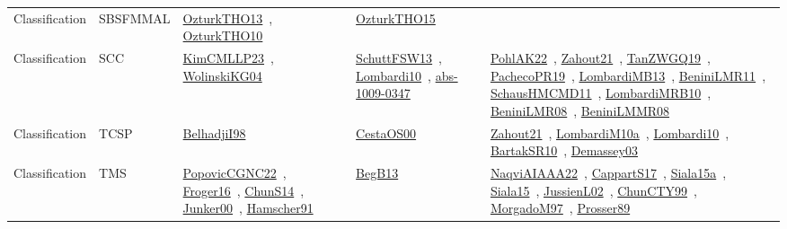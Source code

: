{\begin{longtable}{lp{3cm}>{\raggedright\arraybackslash}p{6cm}>{\raggedright\arraybackslash}p{6cm}>{\raggedright\arraybackslash}p{8cm}}
\index{SBSFMMAL}\index{Classification!SBSFMMAL}Classification & SBSFMMAL & \href{../works/OzturkTHO13.pdf}{OzturkTHO13}~\cite{OzturkTHO13}, \href{../works/OzturkTHO10.pdf}{OzturkTHO10}~\cite{OzturkTHO10} & \href{../works/OzturkTHO15.pdf}{OzturkTHO15}~\cite{OzturkTHO15} & \\
\index{SCC}\index{Classification!SCC}Classification & SCC & \href{../works/KimCMLLP23.pdf}{KimCMLLP23}~\cite{KimCMLLP23}, \href{../works/WolinskiKG04.pdf}{WolinskiKG04}~\cite{WolinskiKG04} & \href{../works/SchuttFSW13.pdf}{SchuttFSW13}~\cite{SchuttFSW13}, \href{../works/Lombardi10.pdf}{Lombardi10}~\cite{Lombardi10}, \href{../works/abs-1009-0347.pdf}{abs-1009-0347}~\cite{abs-1009-0347} & \href{../works/PohlAK22.pdf}{PohlAK22}~\cite{PohlAK22}, \href{../works/Zahout21.pdf}{Zahout21}~\cite{Zahout21}, \href{../works/TanZWGQ19.pdf}{TanZWGQ19}~\cite{TanZWGQ19}, \href{../works/PachecoPR19.pdf}{PachecoPR19}~\cite{PachecoPR19}, \href{../works/LombardiMB13.pdf}{LombardiMB13}~\cite{LombardiMB13}, \href{../works/BeniniLMR11.pdf}{BeniniLMR11}~\cite{BeniniLMR11}, \href{../works/SchausHMCMD11.pdf}{SchausHMCMD11}~\cite{SchausHMCMD11}, \href{../works/LombardiMRB10.pdf}{LombardiMRB10}~\cite{LombardiMRB10}, \href{../works/BeniniLMR08.pdf}{BeniniLMR08}~\cite{BeniniLMR08}, \href{../works/BeniniLMMR08.pdf}{BeniniLMMR08}~\cite{BeniniLMMR08}\\
\index{TCSP}\index{Classification!TCSP}Classification & TCSP & \href{../works/BelhadjiI98.pdf}{BelhadjiI98}~\cite{BelhadjiI98} & \href{../works/CestaOS00.pdf}{CestaOS00}~\cite{CestaOS00} & \href{../works/Zahout21.pdf}{Zahout21}~\cite{Zahout21}, \href{../works/LombardiM10a.pdf}{LombardiM10a}~\cite{LombardiM10a}, \href{../works/Lombardi10.pdf}{Lombardi10}~\cite{Lombardi10}, \href{../works/BartakSR10.pdf}{BartakSR10}~\cite{BartakSR10}, \href{../works/Demassey03.pdf}{Demassey03}~\cite{Demassey03}\\
\index{TMS}\index{Classification!TMS}Classification & TMS & \href{../works/PopovicCGNC22.pdf}{PopovicCGNC22}~\cite{PopovicCGNC22}, \href{../works/Froger16.pdf}{Froger16}~\cite{Froger16}, \href{../works/ChunS14.pdf}{ChunS14}~\cite{ChunS14}, \href{../works/Junker00.pdf}{Junker00}~\cite{Junker00}, \href{../works/Hamscher91.pdf}{Hamscher91}~\cite{Hamscher91} & \href{../works/BegB13.pdf}{BegB13}~\cite{BegB13} & \href{../works/NaqviAIAAA22.pdf}{NaqviAIAAA22}~\cite{NaqviAIAAA22}, \href{../works/CappartS17.pdf}{CappartS17}~\cite{CappartS17}, \href{../works/Siala15a.pdf}{Siala15a}~\cite{Siala15a}, \href{../works/Siala15.pdf}{Siala15}~\cite{Siala15}, \href{../works/JussienL02.pdf}{JussienL02}~\cite{JussienL02}, \href{../works/ChunCTY99.pdf}{ChunCTY99}~\cite{ChunCTY99}, \href{../works/MorgadoM97.pdf}{MorgadoM97}~\cite{MorgadoM97}, \href{../works/Prosser89.pdf}{Prosser89}~\cite{Prosser89}\\

\end{longtable}}

